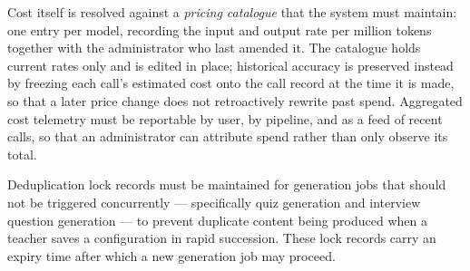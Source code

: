 Cost itself is resolved against a \textit{pricing catalogue} that the
system must maintain: one entry per model, recording the input and
output rate per million tokens together with the administrator who
last amended it. The catalogue holds current rates only and is edited
in place; historical accuracy is preserved instead by freezing each
call's estimated cost onto the call record at the time it is made, so
that a later price change does not retroactively rewrite past spend.
Aggregated cost telemetry must be reportable by user, by pipeline, and
as a feed of recent calls, so that an administrator can attribute
spend rather than only observe its total.

Deduplication lock records must be maintained for generation jobs 
that should not be triggered concurrently — specifically quiz 
generation and interview question generation — to prevent duplicate 
content being produced when a teacher saves a configuration in rapid 
succession. These lock records carry an expiry time after which a 
new generation job may proceed.
